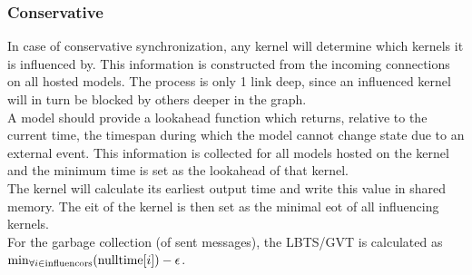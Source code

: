 \subsubsection{Conservative}
In case of conservative synchronization, any kernel will determine which kernels it is influenced by. This information is constructed from the incoming connections on all hosted models. The process is only 1 link deep, since an influenced kernel will in turn be blocked by others deeper in the graph.\\
A model should provide a lookahead function which returns, relative to the current time, the timespan during which the model cannot change state due to an external event. This information is collected for all models hosted on the kernel and the minimum time is set as the lookahead of that kernel. \\
The kernel will calculate its earliest output time and write this value in shared memory. The eit of the kernel is then set as the minimal eot of all influencing kernels. \\
For the garbage collection (of sent messages), the LBTS/GVT is calculated as $\min_{\forall i \in \textup{influencors}}( \textup{nulltime}[i])  - \epsilon $.\\

